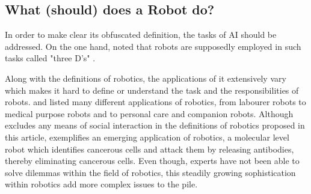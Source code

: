 \documentclass[man]{apa6}
\begin{document}
\subsection{What (should) does a Robot do?}
In order to make clear its obfuscated definition, the tasks of AI should be addressed. On the one hand,   noted that robots are supposedly employed in such tasks called "three D's" .\par 
Along with the definitions of robotics, the applications of it extensively vary which makes it hard to define or understand the task and the responsibilities of robots.  and  listed many different applications of robotics, from labourer robots to medical purpose robots and to personal care and companion robots.
Although  excludes any means of social interaction in the definitions of robotics proposed in this article,  exemplifies an emerging application of robotics, a molecular level robot which identifies cancerous cells and attack them by releasing antibodies, thereby eliminating cancerous cells. Even though, experts have not been able to solve dilemmas within the field of robotics, this steadily growing sophistication within robotics add more complex issues to the pile.
\end{document}
